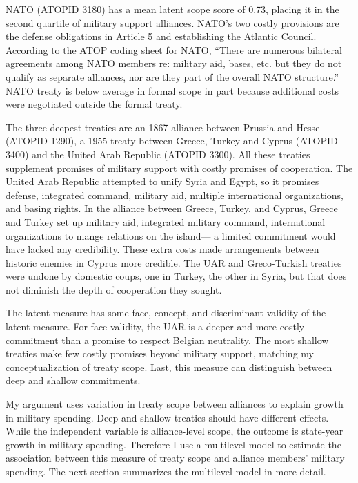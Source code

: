 \documentclass[12pt]{article}
\begin{document}
NATO (ATOPID 3180) has a mean latent scope score of 0.73, placing it in the second quartile of military support alliances. 
NATO's two costly provisions are the defense obligations in Article 5 and establishing the Atlantic Council. 
According to the ATOP coding sheet for NATO, ``There are numerous bilateral agreements among NATO members re: military aid, bases, etc. but they do not qualify as separate alliances, nor are they part of the overall NATO structure.''
NATO treaty is below average in formal scope in part because additional costs were negotiated outside the formal treaty.    


The three deepest treaties are an 1867 alliance between Prussia and Hesse (ATOPID 1290), a 1955 treaty between Greece, Turkey and Cyprus (ATOPID 3400) and the United Arab Republic (ATOPID 3300).  
All these treaties supplement promises of military support with costly promises of cooperation. 
The United Arab Republic attempted to unify Syria and Egypt, so it promises defense, integrated command, military aid, multiple international organizations, and basing rights. 
In the alliance between Greece, Turkey, and Cyprus, Greece and Turkey set up military aid, integrated military command, international organizations to mange relations on the island--- a limited commitment would have lacked any credibility. 
These extra costs made arrangements between historic enemies in Cyprus more credible. 
The UAR and Greco-Turkish treaties were undone by domestic coups, one in Turkey, the other in Syria, but that does not diminish the depth of cooperation they sought. 


The latent measure has some face, concept, and discriminant validity of the latent measure. 
For face validity, the UAR is a deeper and more costly commitment than a promise to respect Belgian neutrality. 
The most shallow treaties make few costly promises beyond military support, matching my conceptualization of treaty scope. 
Last, this measure can distinguish between deep and shallow commitments. 


My argument uses variation in treaty scope between alliances to explain growth in military spending.
Deep and shallow treaties should have different effects. 
While the independent variable is alliance-level scope, the outcome is state-year growth in military spending. 
Therefore I use a multilevel model to estimate the association between this measure of treaty scope and alliance members' military spending.  
The next section summarizes the multilevel model in more detail. 
\end{document}
